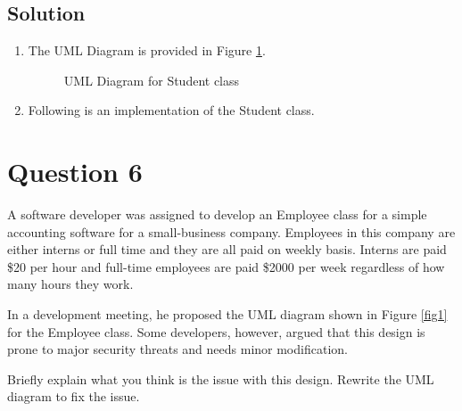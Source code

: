 \documentclass[12pt,letterpaper,twoside]{article}
\begin{document}
\newpage

\subsection*{Solution}

\begin{enumerate}
	\item The UML Diagram is provided in Figure \ref{figQ5}.

	\begin{figure}[H]
		\centering
		\caption{UML Diagram for Student class}\label{figQ5}
	\end{figure}

	\item Following is an implementation of the Student class.

	

\end{enumerate}

\newpage

\section*{Question 6}

A software developer was assigned to develop an Employee class for a simple accounting software for a small-business company.
Employees in this company are either interns or full time and they are all paid on weekly basis.
Interns are paid \$20 per hour and full-time employees are paid \$2000 per week regardless of how many hours they work.

In a development meeting, he proposed the UML diagram shown in Figure \ref{fig1} for the Employee class.
Some developers, however, argued that this design is prone to major security threats and needs minor modification.

Briefly explain what you think is the issue with this design.
Rewrite the UML diagram to fix the issue.
\end{document}
